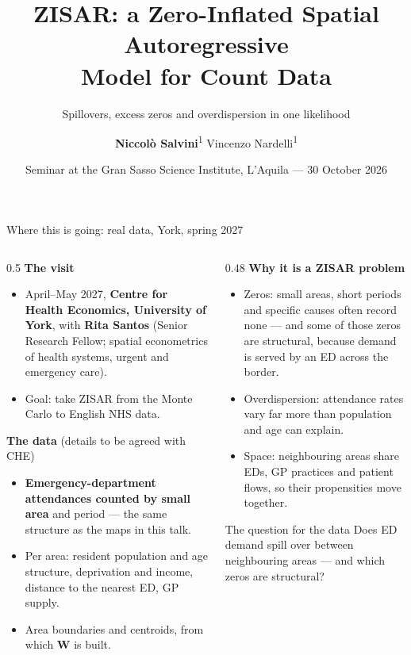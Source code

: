 \documentclass[10pt,aspectratio=169]{beamer}
\title{ZISAR: a Zero-Inflated Spatial Autoregressive\\Model for Count Data}
\subtitle{Spillovers, excess zeros and overdispersion in one likelihood}
\author{\textbf{Niccolò Salvini}\textsuperscript{1} \quad Vincenzo Nardelli\textsuperscript{1}}
\institute{\textsuperscript{1}Università Cattolica del Sacro Cuore, Rome\\[4pt]
  {\small AISRe ``Roberto Camagni'' Post-doctoral Scholarship}}
\date{Seminar at the Gran Sasso Science Institute, L'Aquila --- 30 October 2026}
\newcommand{\bW}{\mathbf{W}}
\begin{document}
\begin{frame}[plain]
  \titlepage
\end{frame}

\begin{frame}{Where this is going: real data, York, spring 2027}
  \footnotesize
  \begin{columns}[T]
    \begin{column}{0.5\textwidth}
      \textbf{The visit}
      \begin{itemize}\setlength{\itemsep}{0.3em}
        \item April--May 2027, \textbf{Centre for Health Economics, University of York}, with \textbf{Rita Santos} (Senior Research Fellow; spatial econometrics of health systems, urgent and emergency care).
        \item Goal: take ZISAR from the Monte Carlo to English NHS data.
      \end{itemize}
      \vspace{0.4em}
      \textbf{The data} {\scriptsize(details to be agreed with CHE)}
      \begin{itemize}\setlength{\itemsep}{0.3em}
        \item \textbf{Emergency-department attendances counted by small area} and period --- the same structure as the maps in this talk.
        \item Per area: resident population and age structure, deprivation and income, distance to the nearest ED, GP supply.
        \item Area boundaries and centroids, from which $\bW$ is built.
      \end{itemize}
    \end{column}
    \begin{column}{0.48\textwidth}
      \textbf{Why it is a ZISAR problem}
      \begin{itemize}\setlength{\itemsep}{0.4em}
        \item \alert{Zeros}: small areas, short periods and specific causes often record none --- and some of those zeros are structural, because demand is served by an ED across the border.
        \item \alert{Overdispersion}: attendance rates vary far more than population and age can explain.
        \item \alert{Space}: neighbouring areas share EDs, GP practices and patient flows, so their propensities move together.
      \end{itemize}
      \vspace{0.1em}
      \begin{block}{The question for the data}
        Does ED demand spill over between neighbouring areas --- and which zeros are structural?
      \end{block}
    \end{column}
  \end{columns}
\end{frame}
\end{document}
